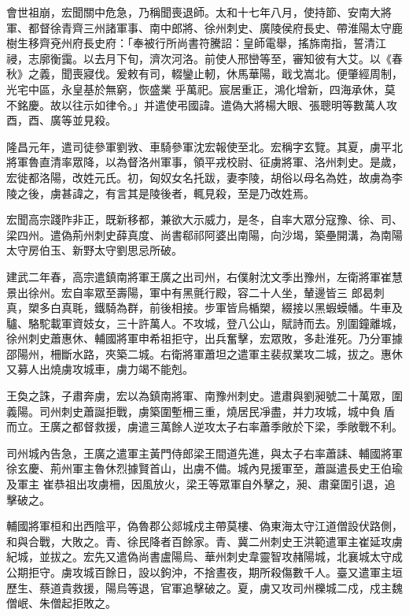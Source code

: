 \begin{pinyinscope}
 會世祖崩，宏聞關中危急，乃稱聞喪退師。太和十七年八月，使持節、安南大將軍、都督徐青齊三州諸軍事、南中郎將、徐州刺史、廣陵侯府長史、帶淮陽太守鹿樹生移齊兗州府長史府：「奉被行所尚書符騰詔：皇師電舉，搖旆南指，誓清江祲，志廓衡靄。以去月下旬，濟次河洛。前使人邢巒等至，審知彼有大艾。以《春秋》之義，聞喪寢伐。爰敕有司，輟鑾止軔，休馬華陽，戢戈嵩北。便肇經周制，光宅中區，永皇基於無窮，恢盛業
 乎萬祀。宸居重正，鴻化增新，四海承休，莫不銘慶。故以往示如律令。」并遣使弔國諱。遣偽大將楊大眼、張聰明等數萬人攻酉，酉、廣等並見殺。



 隆昌元年，遣司徒參軍劉敩、車騎參軍沈宏報使至北。宏稱字玄覽。其夏，虜平北將軍魯直清率眾降，以為督洛州軍事，領平戎校尉、征虜將軍、洛州刺史。是歲，宏徙都洛陽，改姓元氏。初，匈奴女名托跋，妻李陵，胡俗以母名為姓，故虜為李陵之後，虜甚諱之，有言其是陵後者，輒見殺，至是乃改姓焉。



 宏聞高宗踐阼非正，既新移都，兼欲大示威力，是冬，自率大眾分寇豫、徐、司、梁四州。遣偽荊州刺史薛真度、尚書郗祁阿婆出南陽，向沙堨，築壘開溝，為南陽太守房伯玉、新野太守劉思忌所破。



 建武二年春，高宗遣鎮南將軍王廣之出司州，右僕射沈文季出豫州，左衛將軍崔慧景出徐州。宏自率眾至壽陽，軍中有黑氈行殿，容二十人坐，輦邊皆三
 郎曷刺真，槊多白真毦，鐵騎為群，前後相接。步軍皆烏楯槊，綴接以黑蝦蟆幡。牛車及驢、駱駝載軍資妓女，三十許萬人。不攻城，登八公山，賦詩而去。別圍鐘離城，徐州刺史蕭惠休、輔國將軍申希祖拒守，出兵奮擊，宏眾敗，多赴淮死。乃分軍據邵陽州，柵斷水路，夾築二城。右衛將軍蕭坦之遣軍主裴叔業攻二城，拔之。惠休又募人出燒虜攻城車，虜力竭不能剋。



 王奐之誅，子肅奔虜，宏以為鎮南將軍、南豫州刺史。遣肅與劉昶號二十萬眾，圍義陽。司州刺史蕭誕拒戰，虜築圍塹柵三重，燒居民凈盡，并力攻城，城中負盾而立。王廣之都督救援，虜遣三萬餘人逆攻太子右率蕭季敞於下梁，季敞戰不利。



 司州城內告急，王廣之遣軍主黃門侍郎梁王間道先進，與太子右率蕭誄、輔國將軍徐玄慶、荊州軍主魯休烈據賢首山，出虜不備。城內見援軍至，蕭誕遣長史王伯瑜及軍主
 崔恭祖出攻虜柵，因風放火，梁王等眾軍自外擊之，昶、肅棄圍引退，追擊破之。



 輔國將軍桓和出西陰平，偽魯郡公郯城戍主帶莫樓、偽東海太守江道僧設伏路側，和與合戰，大敗之。青、徐民降者百餘家。青、冀二州刺史王洪範遣軍主崔延攻虜紀城，並拔之。宏先又遣偽尚書盧陽烏、華州刺史韋靈智攻赭陽城，北襄城太守成公期拒守。虜攻城百餘日，設以鉤沖，不捨晝夜，期所殺傷數千人。臺又遣軍主垣歷生、蔡道貴救援，陽烏等退，官軍追擊破之。夏，虜又攻司州櫟城二戍，戍主魏僧岷、朱僧起拒敗之。




\end{pinyinscope}
